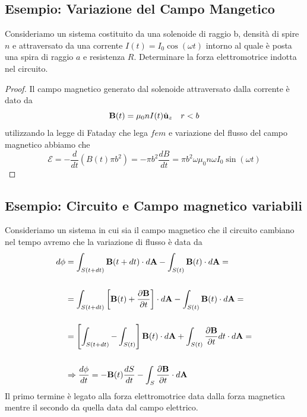 \subsection{Esempio: Variazione del Campo Mangetico}


Consideriamo un sistema costituito da una solenoide di raggio b, densit\`a di spire $n$ e attraversato da una corrente $I(t) = I_0 \cos(\omega t)$ intorno al quale \`e posta una spira di raggio $a$ e resistenza $R$. Determinare la forza elettromotrice indotta nel circuito.

\begin{proof}
	Il campo magnetico generato dal solenoide attraversato dalla corrente \`e dato da 
	\begin{equation*}
		\bold{B}(t) = \mu_0 nI(t) \hat{\bold{u}}_z \quad r<b
	\end{equation*}
utilizzando la legge di Fataday che lega $fem$ e variazione del flusso del campo magnetico abbiamo che 
\begin{equation*}
	\mathcal{E} = - \frac{d}{dt}(B(t) \pi b^2) = -\pi b^2 \frac{dB}{dt} = \pi b^2 \omega \mu_0 n \omega I_0 \sin(\omega t)
\end{equation*}
\end{proof}

\subsection{Esempio: Circuito e Campo magnetico variabili}

Consideriamo un sistema in cui sia il campo magnetico che il circuito cambiano nel tempo avremo che la variazione di flusso \`e data da
\begin{align*}
	d \phi & = \int_{S(t + dt)} \bold{B}(t + dt) \cdot d \bold{A} - \int_{S(t)} \bold{B}(t) \cdot d\bold{A} = \\ \rule{0pt}{30pt}
	& =\int_{S(t+dt)}\left[ \bold{B}(t) + \frac{\partial \bold{B}}{\partial t}\right] \cdot d \bold{A} - \int_{S(t)} \bold{B}(t) \cdot d\bold{A} = \\ \rule{0pt}{30pt}
	& = \left[\int_{S(t+dt)} - \int_{S(t)}\right] \bold{B}(t) \cdot d\bold{A} +\int_{S(t)} \frac{\partial \bold{B}}{\partial t} dt \cdot d\bold{A} = \\ \rule{0pt}{30pt}
	& \Rightarrow \frac{d \phi }{dt } = - \bold{B}(t) \frac{dS}{dt} - \int_{S} \frac{\partial \bold{B}}{\partial t} \cdot d \bold{A} 
\end{align*}
Il primo termine \`e legato alla forza elettromotrice data dalla forza magnetica mentre il secondo da quella data dal campo elettrico. 

